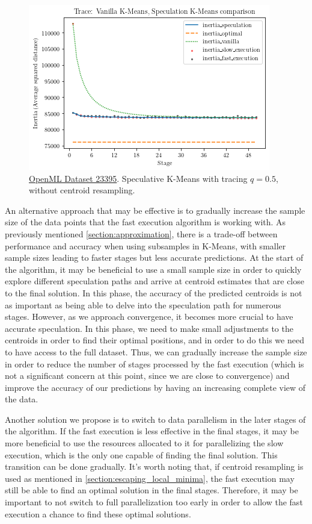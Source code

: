 \begin{figure}[h]
\centering
\includegraphics[width=\linewidth]{./plots/vanilla_speculation_comparison_trace.png}
\caption{\href{https://www.openml.org/d/23395}{OpenML Dataset 23395}. Speculative K-Means with tracing $q = 0.5$, without centroid resampling.}
\label{fig:vanilla_speculation_comparison_trace}
\end{figure}

An alternative approach that may be effective is to gradually increase the sample size of the data points that the fast execution algorithm is working with. As previously mentioned \ref{section:approximation}, there is a trade-off between performance and accuracy when using subsamples in K-Means, with smaller sample sizes leading to faster stages but less accurate predictions. At the start of the algorithm, it may be beneficial to use a small sample size in order to quickly explore different speculation paths and arrive at centroid estimates that are close to the final solution. In this phase, the accuracy of the predicted centroids is not as important as being able to delve into the speculation path for numerous stages. However, as we approach convergence, it becomes more crucial to have accurate speculation. In this phase, we need to make small adjustments to the centroids in order to find their optimal positions, and in order to do this we need to have access to the full dataset. Thus, we can gradually increase the sample size in order to reduce the number of stages processed by the fast execution (which is not a significant concern at this point, since we are close to convergence) and improve the accuracy of our predictions by having an increasing complete view of the data.

Another solution we propose is to switch to data parallelism in the later stages of the algorithm. If the fast execution is less effective in the final stages, it may be more beneficial to use the resources allocated to it for parallelizing the slow execution, which is the only one capable of finding the final solution. This transition can be done gradually. It's worth noting that, if centroid resampling is used as mentioned in \ref{section:escaping_local_minima}, the fast execution may still be able to find an optimal solution in the final stages. Therefore, it may be important to not switch to full parallelization too early in order to allow the fast execution a chance to find these optimal solutions.
